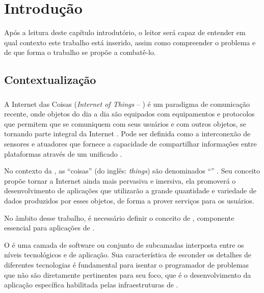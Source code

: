 \chapter{Introdução}

Após a leitura deste capítulo introdutório, o leitor será capaz de entender em qual contexto este trabalho está inserido, assim como compreender o problema e de que forma o trabalho se propõe a combatê-lo.

\section{Contextualização}

\subsection{\iot}

A Internet das Coisas (\textit{Internet of Things} -- \iot) é um paradigma de comunicação recente, onde objetos do dia a dia são equipados com equipamentos e protocolos que permitem que se comuniquem com seus usuários e com outros objetos, se tornando parte integral da Internet \cite{atzori:iera:morabito:2010}.  Pode ser definida como a interconexão de sensores e atuadores que fornece a capacidade de compartilhar informações entre plataformas através de um \framework unificado \cite{gubbi:et:al:2013}. 

No contexto da \iot, as ``coisas'' (do inglês: \textit{things}) são denominados ``\smartobjs'' \cite{bandyopadhyay:sen:2011}. Seu conceito propõe tornar a Internet ainda mais pervasiva e imersiva, ela promoverá o desenvolvimento de aplicações que utilizarão a grande quantidade e variedade de dados produzidos por esses objetos, de forma a prover serviços para os usuários. 


No âmbito desse trabalho, é necessário definir o conceito de \middleware, componente essencial para aplicações de \iot.
\begin{citacao}
	O \middleware é uma camada de software ou conjunto de subcamadas interposta entre os níveis tecnológicos e de aplicação. Sua característica de esconder os detalhes de diferentes tecnologias é fundamental para isentar o programador de problemas que não são diretamente pertinentes para seu foco, que é o desenvolvimento da aplicação específica habilitada pelas infraestruturas de \iot \cite[tradução~nossa]{atzori:iera:morabito:2010}.
\end{citacao}


